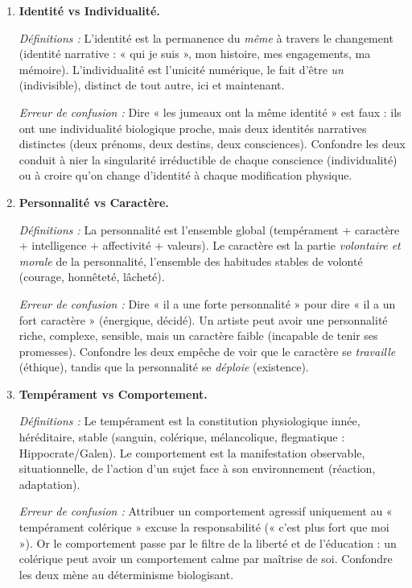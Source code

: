 \documentclass[11pt]{article}
\newcommand{\cle}[1]{{\popxbold\color{popdark}#1}}
\begin{document}
\begin{corrige}
\begin{enumerate}
\item \textbf{Identité vs Individualité.}
\par \textit{Définitions :} L'\cle{identité} est la permanence du \emph{même} à travers le changement (identité narrative : « qui je suis », mon histoire, mes engagements, ma mémoire). L'\cle{individualité} est l'unicité numérique, le fait d'être \emph{un} (indivisible), distinct de tout autre, ici et maintenant.
\par \textit{Erreur de confusion :} Dire « les jumeaux ont la même identité » est faux : ils ont une individualité biologique proche, mais deux identités narratives distinctes (deux prénoms, deux destins, deux consciences). Confondre les deux conduit à nier la singularité irréductible de chaque conscience (individualité) ou à croire qu'on change d'identité à chaque modification physique.

\item \textbf{Personnalité vs Caractère.}
\par \textit{Définitions :} La \cle{personnalité} est l'ensemble global (tempérament + caractère + intelligence + affectivité + valeurs). Le \cle{caractère} est la partie \emph{volontaire et morale} de la personnalité, l'ensemble des habitudes stables de volonté (courage, honnêteté, lâcheté).
\par \textit{Erreur de confusion :} Dire « il a une forte personnalité » pour dire « il a un fort caractère » (énergique, décidé). Un artiste peut avoir une personnalité riche, complexe, sensible, mais un caractère faible (incapable de tenir ses promesses). Confondre les deux empêche de voir que le caractère se \emph{travaille} (éthique), tandis que la personnalité se \emph{déploie} (existence).

\item \textbf{Tempérament vs Comportement.}
\par \textit{Définitions :} Le \cle{tempérament} est la constitution physiologique innée, héréditaire, stable (sanguin, colérique, mélancolique, flegmatique : Hippocrate/Galen). Le \cle{comportement} est la manifestation observable, situationnelle, de l'action d'un sujet face à son environnement (réaction, adaptation).
\par \textit{Erreur de confusion :} Attribuer un comportement agressif uniquement au « tempérament colérique » excuse la responsabilité (« c'est plus fort que moi »). Or le comportement passe par le filtre de la liberté et de l'éducation : un colérique peut avoir un comportement calme par maîtrise de soi. Confondre les deux mène au déterminisme biologisant.


\end{enumerate}
\end{corrige}
\end{document}
